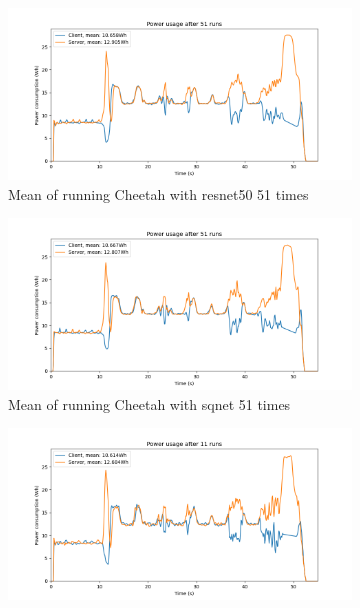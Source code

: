 \documentclass[../thesis.tex]{subfiles}
\begin{document}
\begin{figure}[hbt!]
    \begin{subfigure}{\linewidth}
            \includegraphics[width=\textwidth]{Thesis/Images/Means/mean_cheetah_resnet50.png}
            \caption{Mean of running Cheetah with resnet50 51 times}
            \label{fig:bmean_cheetah_resnet50}
    \end{subfigure}
    \begin{subfigure}{\linewidth}
            \includegraphics[width=\textwidth]{Thesis/Images/Means/mean_cheetah_sqnet.png}
            \caption{Mean of running Cheetah with sqnet 51 times}
            \label{fig:bmean_cheetah_sqnet}
    \end{subfigure}    
    \begin{subfigure}{\linewidth}
            \includegraphics[width=\textwidth]{Thesis/Images/Means/mean_SCI_HE_sqnet.png}

\end{subfigure}
\end{figure}
\end{document}
